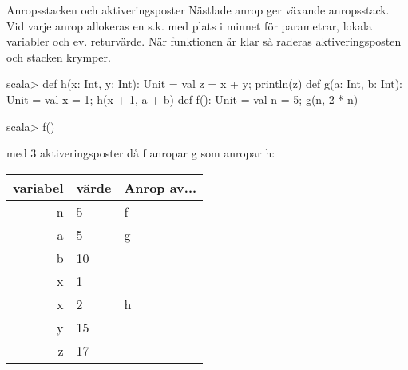 %
%
%

\begin{Slide}{Anropsstacken och aktiveringsposter}\SlideFontSmall
Nästlade anrop ger växande anropsstack. Vid varje anrop allokeras en s.k.   med plats i minnet för parametrar, lokala variabler och ev. returvärde. När funktionen är klar så raderas aktiveringsposten och stacken krymper.
\begin{REPLsmall}
scala> def h(x: Int, y: Int): Unit = { val z = x + y; println(z) }
       def g(a: Int, b: Int): Unit = { val x = 1; h(x + 1, a + b) }
       def f(): Unit = { val n = 5; g(n, 2 * n) }

scala> f()

\end{REPLsmall}

\pause
{} med 3 aktiveringsposter då f anropar g som anropar h:

\begin{tabular}{|r | l | l |} \hline

variabel & värde & Anrop av... \\ \hline \hline
\pause
 n & 5 & f \\ \hline
 \pause
 a & 5 & g \\
 b & 10 &  \\
 x & 1  &  \\  \hline
 \pause
 x & 2  & h \\
 y & 15 &  \\
 z & 17 & \\ \hline
\end{tabular}
\end{Slide}

